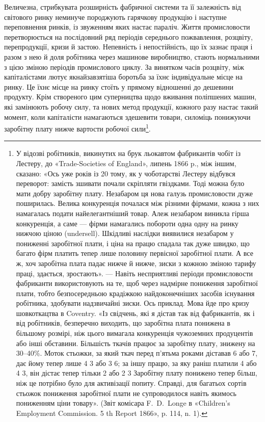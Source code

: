 Величезна, стрибкувата розширність фабричної системи та
її залежність від світового ринку неминуче породжують гарячкову
продукцію і наступне переповнення ринків, із звуженням
яких настає параліч. Життя промисловости перетворюється на
послідовний ряд періодів середнього пожвавлення, розцвіту,
перепродукції, кризи й застою. Непевність і непостійність, що
їх зазнає праця і разом з нею й доля робітника через машинове
виробництво, стають нормальними з цією зміною періодів промислового
циклу. За винятком часів розцвіту, між капіталістами лютує
якнайзавзятіша боротьба за їхнє індивідуальне місце на ринку.
Це їхнє місце на ринку стоїть у прямому відношенні до дешевини
продукту. Крім створеного цим суперництва щодо вживання
поліпшених машин, які замінюють робочу силу, та нових метод
продукції, кожного разу настає такий момент, коли капіталісти
намагаються здешевити товари, силоміць понижуючи заробітну
плату нижче вартости робочої сили\footnote{
У відозві робітників, викинутих на брук льокавтом фабрикантів
чобіт із Лестеру, до «Trade-Societies of England», липень 1866 p., між
іншим, сказано: «Ось уже років із 20 тому, як у чоботарстві Лестеру
відбувся переворот: замість зшивати почали скріпляти гвіздками. Тоді
можна було мати добру заробітну плату. Незабаром ця нова галузь промисловости
дуже поширилась. Велика конкуренція почалася між різними
фірмами, кожна з них намагалась подати найелегантніший товар. Алеж
незабаром виникла гірша конкуренція, а саме — фірми намагались побороти
одна одну на ринку нижчою ціною (undersell). Шкідливі наслідки виявилися
незабаром у пониженні заробітної плати, і ціна на працю спадала
так дуже швидко, що багато фірм платить тепер лише половину первісної
заробітної плати. А все ж, хоч заробітна плата падає нижче й нижче,
зиски з кожною зміною тарифу праці, здається, зростають». — Навіть
несприятливі періоди промисловости фабриканти використовують на те,
щоб через надмірне пониження заробітної плати, тобто безпосередньою
крадіжкою найдоконечніших засобів існування робітника, здобувати
надзвичайні зиски. Ось приклад. Мова йде про кризу шовкоткацтва в
Coventry. «Із свідчень, які я дістав так від фабрикантів, як і від робітників,
безперечно виходить, що заробітна плата понижена в більшому розмірі,
ніж цього вимагала конкуренція чужоземних продуцентів або інші обставини.
Більшість ткачів працює за заробітну плату, знижену на 30--40\%.
Моток стьожки, за який ткач перед п’ятьма роками діставав 6 або 7,
дає йому тепер лише 4 3 або 3 6;
за іншу працю, за яку раніш платили 4 або 4 3,
він дістає тепер тільки 2 або 2 3 Заробітну плату
понижено тепер більш, ніж це потрібно було для активізації попиту.
Справді, для багатьох сортів стьожок пониження заробітної плати не
супроводилося навіть якимось пониженням ціни товару». (Звіт комісара
F.~D.~Longe в «Children’s Employment Commission. 5 th Report 1866»,
p. 114, n. 1).
}.


